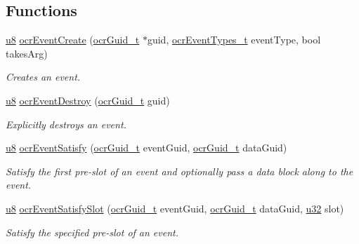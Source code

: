 \subsection*{Functions}
\begin{DoxyCompactItemize}
\item
\hyperlink{group__OCRTypesGeneral_ga92c50087ca0e64fa93fc59402c55f8ca}{u8} \hyperlink{group__OCREvents_gab4cd41f97cc692a86f887b404b055066}
{ocr\-Event\-Create} (\hyperlink{group__OCRTypesGeneral_gacde3883d1ce245c051133c2c3aa82fc8}{ocr\-Guid\-\_\-t} $\ast$guid, \hyperlink{group__OCRTypesEvents_ga42f4195355182edfaa79c9ef3f2c07b1}{ocr\-Event\-Types\-\_\-t} event\-Type, bool takes\-Arg)
\begin{DoxyCompactList}\small\item\em Creates an event. \end{DoxyCompactList}

\item
\hyperlink{group__OCRTypesGeneral_ga92c50087ca0e64fa93fc59402c55f8ca}{u8} \hyperlink{group__OCREvents_ga24d30531aaa059c1086fc74712d4f23d}
{ocr\-Event\-Destroy} (\hyperlink{group__OCRTypesGeneral_gacde3883d1ce245c051133c2c3aa82fc8}{ocr\-Guid\-\_\-t} guid)
\begin{DoxyCompactList}\small\item\em Explicitly destroys an event. \end{DoxyCompactList}

\item
\hyperlink{group__OCRTypesGeneral_ga92c50087ca0e64fa93fc59402c55f8ca}{u8} \hyperlink{group__OCREvents_gab27ef5d905c01ba534e86f8e7e91eaf0}
{ocr\-Event\-Satisfy} (\hyperlink{group__OCRTypesGeneral_gacde3883d1ce245c051133c2c3aa82fc8}{ocr\-Guid\-\_\-t} event\-Guid, \hyperlink{group__OCRTypesGeneral_gacde3883d1ce245c051133c2c3aa82fc8}{ocr\-Guid\-\_\-t} data\-Guid)
\begin{DoxyCompactList}\small\item\em Satisfy the first pre-\/slot of an event and optionally pass a data block along to the event. \end{DoxyCompactList}

\item
\hyperlink{group__OCRTypesGeneral_ga92c50087ca0e64fa93fc59402c55f8ca}{u8} \hyperlink{group__OCREvents_gab53103ecf0c74b55830edf5b8d14a942}
{ocr\-Event\-Satisfy\-Slot} (\hyperlink{group__OCRTypesGeneral_gacde3883d1ce245c051133c2c3aa82fc8}{ocr\-Guid\-\_\-t} event\-Guid, \hyperlink{group__OCRTypesGeneral_gacde3883d1ce245c051133c2c3aa82fc8}{ocr\-Guid\-\_\-t} data\-Guid, \hyperlink{group__OCRTypesGeneral_gafaa62991928fb9fb18ff0db62a040aba}{u32} slot)
\begin{DoxyCompactList}\small\item\em Satisfy the specified pre-\/slot of an event. \end{DoxyCompactList}
\end{DoxyCompactItemize}

